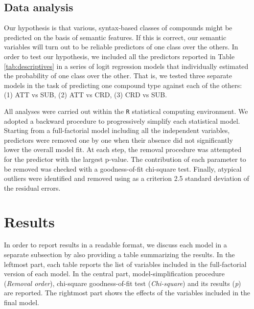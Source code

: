\documentclass[output=paper]{langsci/langscibook}
\begin{document}
\subsection{Data analysis}


Our hypothesis is that various, syntax-based classes of compounds might be predicted on the basis of semantic features. If this is correct, our semantic variables will turn out to be reliable predictors of one class over the others. In order to test our hypothesis, we included all the predictors reported in Table \ref{tab:descriptives} in a series of logit regression models that individually estimated the probability of one class over the other. That is, we tested three separate models in the task of predicting one compound type against each of the others: (1) ATT vs SUB, (2) ATT vs CRD, (3) CRD vs SUB.

All analyses were carried out within the \texttt{R} statistical computing environment. We adopted a backward procedure to progressively simplify each statistical model. Starting from a full-factorial model including all the independent variables, predictors were removed one by one when their absence did not significantly lower the overall model fit. At each step, the removal procedure was attempted for the predictor with the largest p-value. The contribution of each parameter to be removed was checked with a goodness-of-fit chi-square test. Finally, atypical outliers were identified and removed using as a criterion 2.5 standard deviation of the residual errors.


\section{Results}
\label{sec:results}

In order to report results in a readable format, we discuss each model in a separate subsection by also providing a table summarizing the results. In the leftmost part, each table reports the list of variables included in the full-factorial version of each model. In the central part, model-simplification procedure (\emph{Removal order}), chi-square goodness-of-fit test (\emph{Chi-square}) and its results (\emph{p}) are reported. The rightmost part shows the effects of the variables included in the final model.
\end{document}
